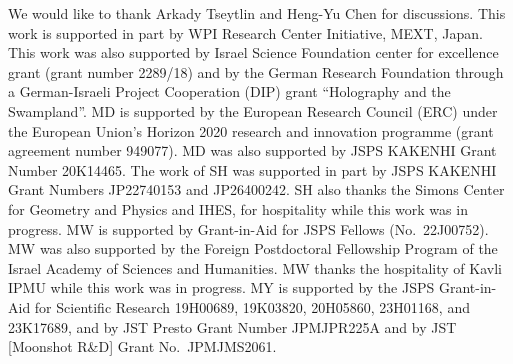 \documentclass[12pt]{article}
\begin{document}
We would like to thank Arkady Tseytlin and Heng-Yu Chen for discussions.
This work is supported in part by WPI Research Center Initiative, MEXT,
Japan. 
This work was also supported by Israel Science Foundation center for excellence grant (grant number 2289/18) and by the German Research Foundation through a German-Israeli Project Cooperation (DIP) grant ``Holography and the Swampland''.
MD is supported by the European Research Council (ERC) under the European Union’s Horizon 2020 research and innovation programme (grant agreement number 949077). 
MD was also supported by JSPS KAKENHI Grant Number 20K14465.
The work of SH was supported in part by JSPS KAKENHI
Grant Numbers JP22740153 and JP26400242.  SH also thanks the Simons
Center for Geometry and Physics and IHES, for hospitality while this work was in progress.
MW is supported by Grant-in-Aid for 
JSPS Fellows (No.\ 22J00752).
MW was also supported by the Foreign Postdoctoral Fellowship Program of the Israel Academy of Sciences and Humanities.
MW thanks the hospitality of Kavli IPMU while this work was in progress.
MY is supported by the JSPS Grant-in-Aid for Scientific Research
19H00689, 19K03820, 20H05860, 23H01168, and 23K17689, and by
JST Presto Grant Number  JPMJPR225A and by JST [Moonshot R\&D] Grant No.\ JPMJMS2061. 



\end{document}
